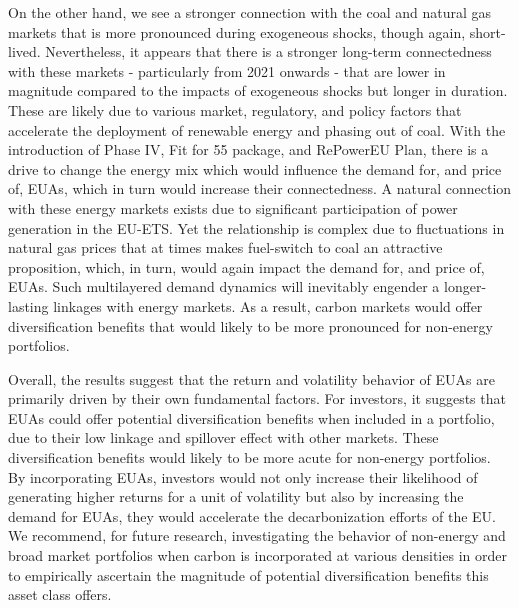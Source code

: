 \documentclass[preprint, 3p,
authoryear]{elsarticle} %
\begin{document}
On the other hand, we see a stronger connection with the coal and
natural gas markets that is more pronounced during exogeneous shocks,
though again, short-lived. Nevertheless, it appears that there is a
stronger long-term connectedness with these markets - particularly from
2021 onwards - that are lower in magnitude compared to the impacts of
exogeneous shocks but longer in duration. These are likely due to
various market, regulatory, and policy factors that accelerate the
deployment of renewable energy and phasing out of coal. With the
introduction of Phase IV, Fit for 55 package, and RePowerEU Plan, there
is a drive to change the energy mix which would influence the demand
for, and price of, EUAs, which in turn would increase their
connectedness. A natural connection with these energy markets exists due
to significant participation of power generation in the EU-ETS. Yet the
relationship is complex due to fluctuations in natural gas prices that
at times makes fuel-switch to coal an attractive proposition, which, in
turn, would again impact the demand for, and price of, EUAs. Such
multilayered demand dynamics will inevitably engender a longer-lasting
linkages with energy markets. As a result, carbon markets would offer
diversification benefits that would likely to be more pronounced for
non-energy portfolios.

Overall, the results suggest that the return and volatility behavior of
EUAs are primarily driven by their own fundamental factors. For
investors, it suggests that EUAs could offer potential diversification
benefits when included in a portfolio, due to their low linkage and
spillover effect with other markets. These diversification benefits
would likely to be more acute for non-energy portfolios. By
incorporating EUAs, investors would not only increase their likelihood
of generating higher returns for a unit of volatility but also by
increasing the demand for EUAs, they would accelerate the
decarbonization efforts of the EU. We recommend, for future research,
investigating the behavior of non-energy and broad market portfolios
when carbon is incorporated at various densities in order to empirically
ascertain the magnitude of potential diversification benefits this asset
class offers.

\newpage

\renewcommand\refname{References}

\end{document}
